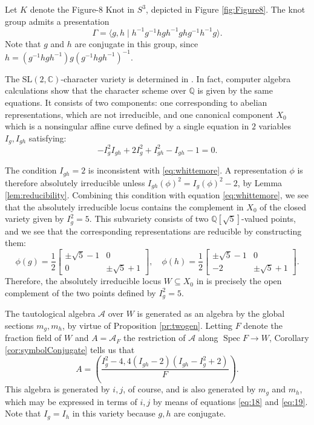 \documentclass[reqno,oneside,dvipsnames,pdfnames,final]{amsart}
\theoremstyle{definition}
\newcommand{\Q}{\mathbb{Q}}
\newcommand{\C}{\mathbb{C}}
\DeclareMathOperator{\Spec}{Spec}
\newcommand{\SL}{\mathrm{SL}}
\newcommand{\sh}[1]{\mathcal{#1}}
\begin{document}
Let $K$ denote the Figure-8 Knot in $S^3$, depicted in Figure \ref{fig:Figure8}. The knot group admits a presentation
\[ \Gamma =\langle g, h\mid h^{-1} g^{-1} hgh^{-1}ghg^{-1}h^{-1}g \rangle. \]
Note that $g$ and $h$ are conjugate in this group, since $h = (g^{-1}hgh^{ -1}) g (g^{-1}hgh^{-1})^{-1}$.

The $\SL(2, \C)$-character variety is determined in \cite{Whittemore1973}. In fact, computer algebra calculations show that the character scheme over $\Q$ is given by the same equations. It consists of two components: one corresponding to abelian representations, which are not irreducible, and one canonical component $X_0$ which is a nonsingular affine curve defined by a single equation in $2$
variables $I_g,I_{gh}$ satisfying:
\begin{equation} \label{eq:whittemore}
  -I_g^2I_{gh}+2I_g^2+I_{gh}^2 - I_{gh} -1=0.
\end{equation}

The condition $I_{gh}=2$ is inconsistent with \eqref{eq:whittemore}. A representation $\phi$ is therefore absolutely irreducible unless $I_{gh}(\phi)^2 = I_g(\phi)^2 -2$, by Lemma \ref{lem:reducibility}. Combining this condition with equation \eqref{eq:whittemore}, we see that the absolutely irreducible locus contains the complement in $X_0$ of the closed variety given by $I_g^2 = 5$. This subvariety consists of two $\Q[\sqrt{5}]$-valued points, and we see that the corresponding representations are reducible by constructing them:
\[\phi(g) = \frac{1}{2} \begin{bmatrix}  \pm \sqrt{5} - 1 & 0 \\  0 & \pm \sqrt{5} +1 \end{bmatrix}, \quad \phi(h) = \frac{1}{2} \begin{bmatrix} \pm \sqrt{5} - 1 & 0 \\  -2  & \pm \sqrt{5} +1 \end{bmatrix}.
\]
Therefore, the absolutely irreducible locus $W\subseteq X_0$ in is precisely the open complement of the two points defined by $I_g^2 = 5$.

The tautological algebra $\sh A$ over $W$ is generated as an algebra by the global sections
$m_g, m_h$, by virtue of Proposition \ref{pr:twogen}. Letting $F$ denote the fraction field of $W$ and $A = \sh A_F$ the restriction of $\sh A$ along $\Spec F \to W$, Corollary \ref{cor:symbolConjugate} tells us that
\[ A = \left( \frac{ I_g^2 - 4, 4(I_{gh}-2)(I_{gh}-I_g^2+2)}{F} \right). \]
This algebra is generated by $i,j$, of course, and is also generated by $m_g$ and $m_h$, which may be expressed in terms of $i,j$ by means of equations \eqref{eq:18} and \eqref{eq:19}. Note that $I_g=I_h$ in this variety because $g,h$ are conjugate.
\end{document}
